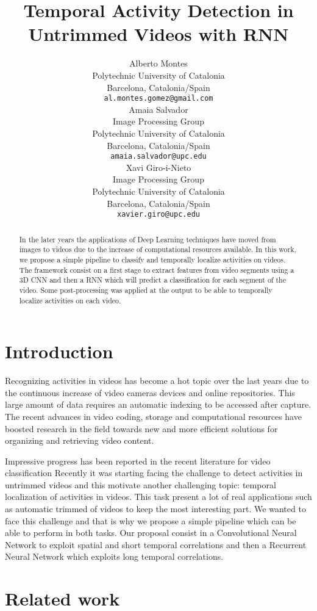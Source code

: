 \documentclass{article}
\title{Temporal Activity Detection in Untrimmed Videos with RNN}
\author{
    Alberto Montes \\
    Polytechnic University of Catalonia \\
    Barcelona, Catalonia/Spain \\
    \texttt{al.montes.gomez@gmail.com} \\
    \And
    Amaia Salvador \\
    Image Processing Group \\
    Polytechnic University of Catalonia \\
    Barcelona, Catalonia/Spain \\
    \texttt{amaia.salvador@upc.edu} \\
    \And
    Xavi Giro-i-Nieto \\
    Image Processing Group \\
    Polytechnic University of Catalonia \\
    Barcelona, Catalonia/Spain \\
    \texttt{xavier.giro@upc.edu} \\
}
\begin{document}

\maketitle

\begin{abstract}

    In the later years the applications of Deep Learning techniques have moved from images to videos due to the increase of computational resources available. In this work, we propose a simple pipeline to classify and temporally localize activities on videos. The framework consist on a first stage to extract features from video segments using a 3D CNN and then a RNN which will predict a classification for each segment of the video. Some post-processing was applied at the output to be able to temporally localize activities on each video.

\end{abstract}

\section{Introduction}

Recognizing activities in videos has become a hot topic over the last years due to the continuous increase of video cameras devices and online repositories.
This large amount of data requires an automatic indexing to be accessed after capture.
The recent advances in video coding, storage and computational resources have boosted research in the field towards new and more efficient solutions for organizing and retrieving video content.

Impressive progress has been reported in the recent literature for video classification %
Recently it was starting facing the challenge to detect activities in untrimmed videos and this motivate another challenging topic: temporal localization of activities in videos.
This task present a lot of real applications such as automatic trimmed of videos to keep the most interesting part.
We wanted to face this challenge and that is why we propose a simple pipeline which can be able to perform in both tasks. Our proposal consist in a Convolutional Neural Network to exploit spatial and short temporal correlations and then a Recurrent Neural Network which exploits long temporal correlations.

\section{Related work}
\end{document}
